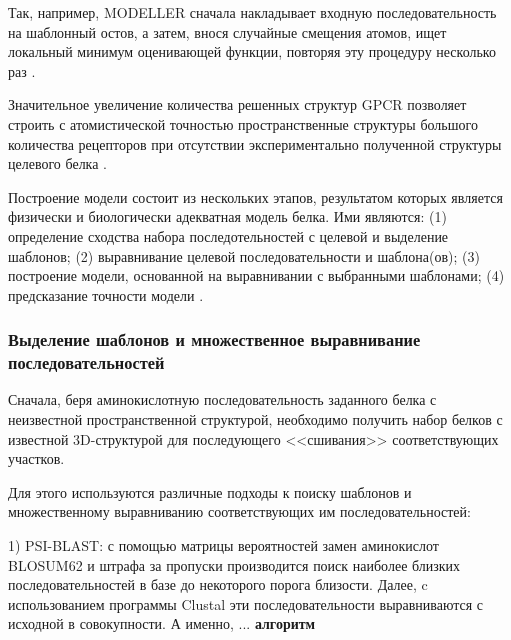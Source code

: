 \documentclass[a4paper,14pt]{extreport}
\begin{document}
	Так, например, MODELLER сначала накладывает входную последовательность на шаблонный остов, а затем, внося случайные смещения атомов, ищет локальный минимум оценивающей функции, повторяя эту процедуру несколько раз \cite{Webb2017}.  
	
	

	Значительное увеличение количества решенных структур GPCR позволяет строить с атомистической точностью пространственные структуры большого количества рецепторов при отсутствии экспериментально полученной структуры целевого белка \cite{Tautermann2017}.
	
	Построение модели состоит из нескольких этапов, результатом которых является физически и биологически адекватная модель белка. Ими являются: (1) определение сходства набора последотельностей с целевой и выделение шаблонов; (2) выравнивание целевой последовательности и шаблона(ов); (3) построение модели, основанной на выравнивании с выбранными шаблонами; (4) предсказание точности модели \cite{Webb2017}.
	\subsubsection{Выделение шаблонов и множественное выравнивание последовательностей}
	Сначала, беря аминокислотную последовательность заданного белка с неизвестной пространственной структурой, необходимо получить набор белков с известной 3D-структурой для последующего <<сшивания>> соответствующих участков.
	
	
	Для этого используются различные подходы к поиску шаблонов и множественному выравниванию соответствующих им последовательностей:
	
	1) PSI-BLAST\cite{ALTSCHUL1990403, Altschul1997}: с помощью матрицы вероятностей замен аминокислот BLOSUM62 и штрафа за пропуски производится поиск наиболее близких последовательностей в базе до некоторого порога близости. Далее, c использованием программы Clustal \cite{Thompson} эти последовательности выравниваются с исходной в совокупности. А именно, ... \textbf{алгоритм}
	
\end{document}
